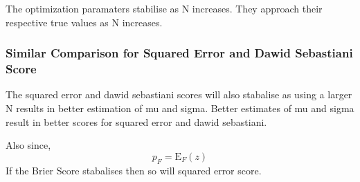 \documentclass[]{article}
\newenvironment{Shaded}{\begin{snugshade}}{\end{snugshade}}
\newcommand{\CommentTok}[1]{\textcolor[rgb]{0.56,0.35,0.01}{\textit{#1}}}
\begin{document}
The optimization paramaters stabilise as N increases. They approach
their respective true values as N increases.

\subsubsection{Similar Comparison for Squared Error and Dawid Sebastiani
Score}\label{similar-comparison-for-squared-error-and-dawid-sebastiani-score}

The squared error and dawid sebastiani scores will also stabalise as
using a larger N results in better estimation of mu and sigma. Better
estimates of mu and sigma result in better scores for squared error and
dawid sebastiani.

Also since, \[ {p_{F}=\mathrm{E}_{F}(z)} \] If the Brier Score
stabalises then so will squared error score.

\begin{Shaded}
\end{Shaded}
\end{document}
